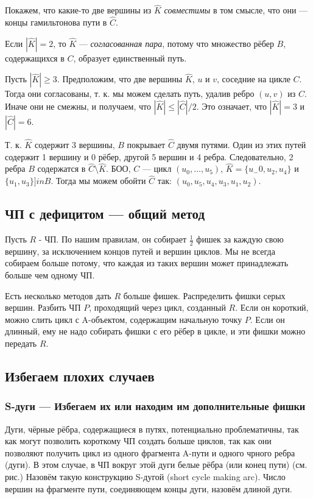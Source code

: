 \begin{proofstar}
Покажем, что какие-то две вершины из $\hat{K}$ \textit{совместимы} в том смысле, что они --- концы гамильтонова пути в $\hat{C}$.

Если $|\hat{K}| = 2$, то $\hat{K}$ --- \textit{согласованная пара}, потому что множество рёбер $B$, содержащихся в $C$, образует единственный путь.

Пусть $|\hat{K}| \ge 3$. 
Предположим, что две вершины $\hat{K}$, $u$ и $v$, соседние на цикле $C$. Тогда они согласованы, т. к. мы можем сделать путь, удалив ребро $(u, v)$ из $C$.
Иначе они не смежны, и получаем, что $|\hat{K}| \le |\hat{C}|/2$. Это означает, что $|\hat{K}| = 3$ и $|\hat{C}| = 6$.

Т. к. $\hat{K}$ содержит 3 вершины, $B$ покрывает $\hat{C}$ двумя путями. Один из этих путей содержит 1 вершину и 0 рёбер, другой 5 вершин и 4 ребра. Следовательно, 2 ребра $B$ содержатся в $\hat{C} \setminus \hat{K}$. БОО, $C$ --- цикл $(u_0, \dots, u_5)$, $\hat{K} = \{u_-0, u_2, u_4\}$ и $\{u_1, u_3\} ]in B$. Тогда мы можем обойти $\hat{C}$ так: $(u_0, u_5, u_4, u_3, u_1, u_2)$.

\subsection{ЧП с дефицитом --- общий метод}
Пусть $R$ - ЧП. По нашим правилам, он собирает $\frac{1}{2}$ фишек за каждую свою вершину, за исключением концов путей и вершин циклов. Мы не всегда собираем больше потому, что каждая из таких вершин может принадлежать больше чем одному ЧП.

Есть несколько методов дать $R$ больше фишек.
Распределить фишки серых вершин.
Разбить ЧП $P$, проходящий через цикл, созданный $R$. Если он короткий, можно слить цикл с A-объектом, содержащим начальную точку $P$. Если он длинный, ему не надо собирать фишки с его рёбер в цикле, и эти фишки можно передать $R$.

\subsection{Избегаем плохих случаев}
\subsubsection{S-дуги --- Избегаем их или находим им дополнительные фишки}

Дуги, чёрные рёбра, содержащиеся в путях, потенциально проблематичны, так как могут позволить короткому ЧП создать больше циклов, так как они позволяют получить цикл из одного фрагмента A-пути и одного чрного ребра (дуги). В этом случае, в ЧП вокруг этой дуги белые рёбра (или конец пути) (см. рис.) Назовём такую конструкцию S-дугой (short cycle making arc). Число вершин на фрагменте пути, соединяющем концы дуги, назовём длиной дуги.


\end{proofstar}
